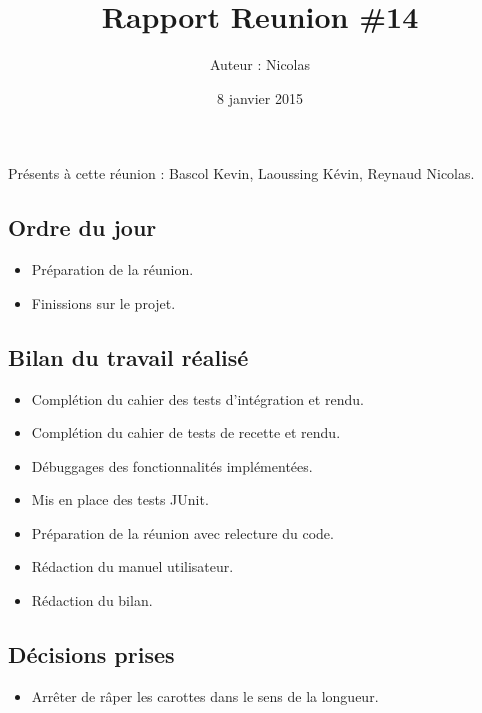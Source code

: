 \documentclass[12pt,a4paper]{article}
\title{Rapport Reunion \#14}
\author{Auteur : Nicolas \bsc{REYNAUD}}
\date{8 janvier 2015}
\begin{document}
\maketitle

\newpage

Présents à cette réunion : Bascol Kevin, Laoussing Kévin, Reynaud Nicolas.

\subsection*{Ordre du jour}
\begin{itemize}[label = $\blacktriangleright$]
\item Préparation de la réunion.
\item Finissions sur le projet.
\end{itemize}

\subsection*{Bilan du travail réalisé}

\begin{itemize}[label = $\blacktriangleright$]
\item Complétion du cahier des tests d'intégration et rendu.

\item Complétion du cahier de tests de recette et rendu.

\item Débuggages des fonctionnalités implémentées.

\item Mis en place des tests JUnit.

\item Préparation de la réunion avec relecture du code.

\item Rédaction du manuel utilisateur.

\item Rédaction du bilan.
\end{itemize}


\subsection*{Décisions prises}

\begin{itemize}[label = $\blacktriangleright$] 
\item Arrêter de râper les carottes dans le sens de la longueur.
\end{itemize}
\end{document}
